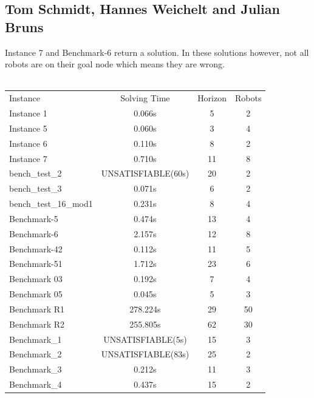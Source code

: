 \documentclass[runningheads]{llncs}
\begin{document}
\subsection{Tom Schmidt, Hannes Weichelt and Julian Bruns}
Instance 7 and Benchmark-6 return a solution. In these solutions however, not all robots
are on their goal node which means they are wrong. \\
\\
\begin{tabular}[h]{l|c|c|c}
Instance & Solving Time & Horizon & Robots \\
Instance 1 & 0.066s & 5 & 2 \\
Instance 5 & 0.060s  & 3 & 4 \\
Instance 6 & 0.110s & 8 & 2 \\
Instance 7 & 0.710s  & 11 & 8 \\
bench\_test\_2 & UNSATISFIABLE(60s) & 20 & 2 \\
bench\_test\_3 & 0.071s & 6 & 2 \\
bench\_test\_16\_mod1 & 0.231s & 8 & 4 \\
Benchmark-5 & 0.474s & 13 & 4 \\
Benchmark-6 & 2.157s & 12 & 8 \\
Benchmark-42 & 0.112s & 11 & 5 \\ 
Benchmark-51 & 1.712s & 23 & 6 \\
Benchmark 03 & 0.192s & 7 & 4 \\
Benchmark 05 & 0.045s & 5 & 3 \\
Benchmark R1 & 278.224s & 29 & 50 \\
Benchmark R2 & 255.805s & 62 & 30 \\
Benchmark\_1 & UNSATISFIABLE(5s) & 15 & 3 \\ 
Benchmark\_2 & UNSATISFIABLE(83s) & 25 & 2 \\
Benchmark\_3 & 0.212s & 11 & 3 \\
Benchmark\_4 & 0.437s & 15 & 2 \\
\end{tabular}
\end{document}
